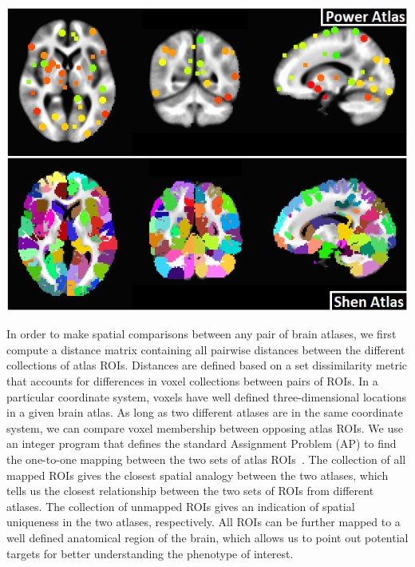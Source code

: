 \documentclass[10pt,letterpaper]{article}\usepackage[]{graphicx}\usepackage[]{color}
\begin{document}
{\centering
	\begin{minipage}[c]{0.55\textwidth}
		\includegraphics[width=1\textwidth,clip,trim=0cm 0cm 0cm 0.0cm]{power_shen_montage2.png}
	\end{minipage}\hfill
	\begin{minipage}[c]{0.43\textwidth}
		\captionsetup{type=figure}\label{fig:power_shen_unmapped}
\end{minipage}}

\vspace{0.25cm}

In order to make spatial comparisons between any pair of brain atlases, we first compute a distance matrix containing all pairwise distances between the different collections of atlas ROIs. Distances are defined based on a set dissimilarity metric that accounts for differences in voxel collections between pairs of ROIs. In a particular coordinate system, voxels have well defined three-dimensional locations in a given brain atlas. As long as two different atlases are in the same coordinate system, we can compare voxel membership between opposing atlas ROIs. We use an integer program that defines the standard Assignment Problem (AP) to find the one-to-one mapping between the two sets of atlas ROIs~\cite{pentico2007}. The collection of all mapped ROIs gives the closest spatial analogy between the two atlases, which tells us the closest relationship between the two sets of ROIs from different atlases. The collection of unmapped ROIs gives an indication of spatial uniqueness in the two atlases, respectively. All ROIs can be further mapped to a well defined anatomical region of the brain, which allows us to point out potential targets for better understanding the phenotype of interest.
\end{document}
